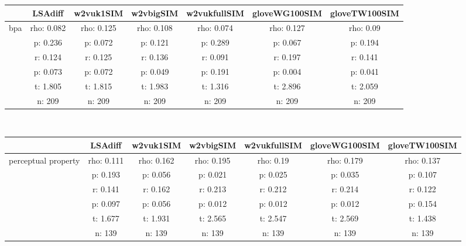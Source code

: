 \documentclass{article}
\begin{document}
\begin{tabular}{ccccccc|}\cline{2-7}
&\multicolumn{1}{|c}{LSAdiff} & w2vuk1SIM & w2vbigSIM & w2vukfullSIM & gloveWG100SIM & gloveTW100SIM \\\hline
\multicolumn{1}{|c|}{\multirow{6}{*}{bpa}} & rho: 0.082 & rho: 0.125 & rho: 0.108 & rho: 0.074 & rho: 0.127 & rho: 0.09 \\
\multicolumn{1}{|c|}{} & p: 0.236 & p: 0.072 & p: 0.121 & p: 0.289 & p: 0.067 & p: 0.194 \\
\multicolumn{1}{|c|}{} & r: 0.124 & r: 0.125 & r: 0.136 & r: 0.091 & r: 0.197 & r: 0.141 \\
\multicolumn{1}{|c|}{} & p: 0.073 & p: 0.072 & p: 0.049 & p: 0.191 & p: 0.004 & p: 0.041 \\
\multicolumn{1}{|c|}{} & t: 1.805 & t: 1.815 & t: 1.983 & t: 1.316 & t: 2.896 & t: 2.059 \\
\multicolumn{1}{|c|}{} & n: 209 & n: 209 & n: 209 & n: 209 & n: 209 & n: 209 \\
\hline
\end{tabular}\\
\begin{tabular}{ccccccc|}\cline{2-7}
&\multicolumn{1}{|c}{LSAdiff} & w2vuk1SIM & w2vbigSIM & w2vukfullSIM & gloveWG100SIM & gloveTW100SIM \\\hline
\multicolumn{1}{|c|}{\multirow{6}{*}{perceptual property}} & rho: 0.111 & rho: 0.162 & rho: 0.195 & rho: 0.19 & rho: 0.179 & rho: 0.137 \\
\multicolumn{1}{|c|}{} & p: 0.193 & p: 0.056 & p: 0.021 & p: 0.025 & p: 0.035 & p: 0.107 \\
\multicolumn{1}{|c|}{} & r: 0.141 & r: 0.162 & r: 0.213 & r: 0.212 & r: 0.214 & r: 0.122 \\
\multicolumn{1}{|c|}{} & p: 0.097 & p: 0.056 & p: 0.012 & p: 0.012 & p: 0.012 & p: 0.154 \\
\multicolumn{1}{|c|}{} & t: 1.677 & t: 1.931 & t: 2.565 & t: 2.547 & t: 2.569 & t: 1.438 \\
\multicolumn{1}{|c|}{} & n: 139 & n: 139 & n: 139 & n: 139 & n: 139 & n: 139 \\
\hline
\end{tabular}\\
\end{document}
